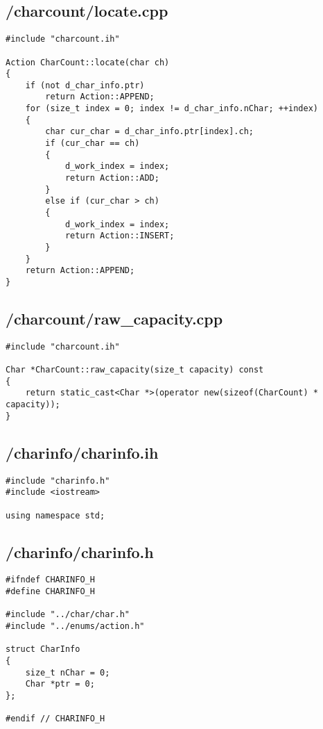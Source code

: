 \documentclass{article}
\begin{document}
\subsection*{/charcount/locate.cpp}
\begin{verbatim}
#include "charcount.ih"

Action CharCount::locate(char ch)
{
    if (not d_char_info.ptr)
        return Action::APPEND;
    for (size_t index = 0; index != d_char_info.nChar; ++index)
    {
        char cur_char = d_char_info.ptr[index].ch;
        if (cur_char == ch)
        {
            d_work_index = index;
            return Action::ADD;
        }
        else if (cur_char > ch)
        {
            d_work_index = index;
            return Action::INSERT;
        }
    }
    return Action::APPEND;
}
\end{verbatim}
\subsection*{/charcount/raw\_capacity.cpp}
\begin{verbatim}
#include "charcount.ih"

Char *CharCount::raw_capacity(size_t capacity) const
{
    return static_cast<Char *>(operator new(sizeof(CharCount) * capacity));
}
\end{verbatim}

\subsection*{/charinfo/charinfo.ih}
\begin{verbatim}
#include "charinfo.h"
#include <iostream>

using namespace std;

\end{verbatim}
\subsection*{/charinfo/charinfo.h}
\begin{verbatim}
#ifndef CHARINFO_H
#define CHARINFO_H

#include "../char/char.h"
#include "../enums/action.h"

struct CharInfo 
{
    size_t nChar = 0;
    Char *ptr = 0;
};

#endif // CHARINFO_H
\end{verbatim}
\end{document}

